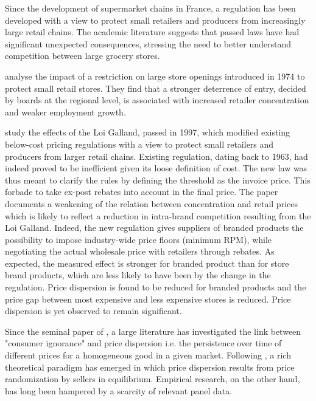 \documentclass[english]{article}
\begin{document}
Since the development of supermarket chains in France, a regulation has been developed with a view to protect small retailers and producers from increasingly large retail chains. The academic literature suggests that passed laws have had significant unexpected consequences, stressing the need to better understand competition between large grocery stores.


\cite{BER02} analyse the impact of a restriction on large store openings introduced in 1974 to protect small retail stores. They find that a stronger deterrence of entry, decided by boards at the regional level, is associated with increased retailer concentration and weaker employment growth.

\cite{BIS13} study the effects of the Loi Galland, passed in 1997, which modified existing below-cost pricing regulations with a view to protect small retailers and producers from larger retail chains. Existing regulation, dating back to 1963, had indeed proved to be inefficient given its loose definition of cost. The new law was thus meant to clarify the rules by defining the threshold as the invoice price. This forbade to take ex-post rebates into account in the final price. The paper documents a weakening of the relation between concentration and retail prices which is likely to reflect a reduction in intra-brand competition resulting from the Loi Galland. Indeed, the new regulation gives suppliers of branded products the possibility to impose industry-wide price floors (minimum RPM), while negotiating the actual wholesale price with retailers through rebates. As expected, the measured effect is stronger for branded product than for store brand products, which are less likely to have been by the change in the regulation. Price dispersion is found to be reduced for branded products and the price gap between most expensive and less expensive stores is reduced. Price dispersion is yet observed to remain significant.

Since the seminal paper of \cite{STI61}, a large literature has investigated the link between "consumer ignorance" and price dispersion i.e. the persistence over time of different prices for a homogeneous good in a given market. Following \cite{VAR80}, a rich theoretical paradigm has emerged in which price dispersion results from price randomization by sellers in equilibrium. Empirical research, on the other hand, has long been hampered by a scarcity of relevant panel data.
\end{document}
